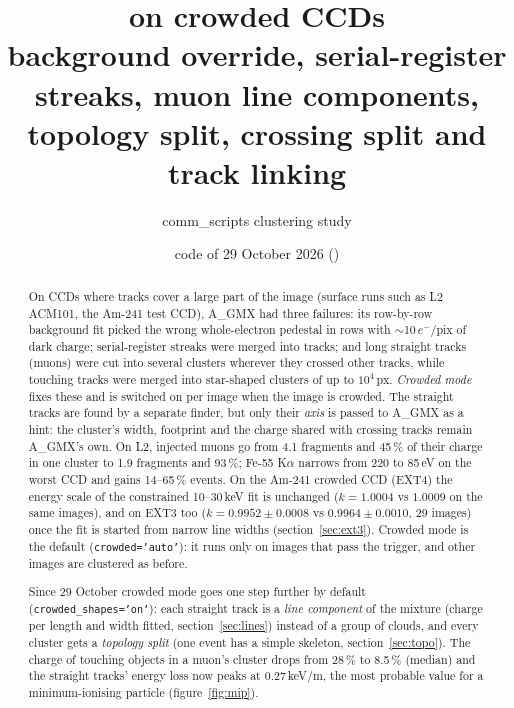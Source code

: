 \documentclass[11pt,a4paper]{article}
\title{\textbf{\AGMX{} on crowded CCDs}\\[4pt]
\large background override, serial-register streaks, muon line components, topology split, crossing split and track linking}
\author{comm\_scripts clustering study}
\date{code of 29 October 2026 (\code{clustering\_tests/crowded.py})}
\newcommand{\el}{\ensuremath{e^-}}
\newcommand{\AGMX}{A\_GMX}
\newcommand{\code}[1]{\texttt{#1}}
\begin{document}
\maketitle

\begin{abstract}
On CCDs where tracks cover a large part of the image (surface runs such as L2 ACM101, the Am-241 test CCD), \AGMX{} had
three failures: its row-by-row background fit picked the wrong whole-electron pedestal in rows with
$\sim$10\,\el/pix of dark charge; serial-register streaks were merged into tracks; and long straight tracks
(muons) were cut into several clusters wherever they crossed other tracks, while touching tracks were merged into star-shaped
clusters of up to $10^4$\,px. \emph{Crowded mode} fixes these and is switched on per image when the image is crowded. The
straight tracks are found by a separate finder, but only their \emph{axis} is passed to \AGMX{} as a hint: the cluster's
width, footprint and the charge shared with crossing tracks remain \AGMX's own. On L2, injected muons go from 4.1 fragments
and 45\,\% of their charge in one cluster to 1.9 fragments and 93\,\%; Fe-55 K$\alpha$ narrows from 220 to 85\,eV on the
worst CCD and gains 14--65\,\% events. On the Am-241 crowded CCD (EXT4) the energy scale of the constrained 10--30\,keV fit is
unchanged ($k=1.0004$ vs $1.0009$ on the same images), and on EXT3 too ($k=0.9952\pm0.0008$ vs $0.9964\pm0.0010$, 29 images)
once the fit is started from narrow line widths (section~\ref{sec:ext3}). Crowded mode is the default
(\code{crowded='auto'}): it runs only on images that pass the trigger, and other images are clustered as before.

Since 29 October crowded mode goes one step further by default (\code{crowded\_shapes='on'}): each straight track is a
\emph{line component} of the mixture (charge per length and width fitted, section~\ref{sec:lines}) instead of a group of clouds,
and every cluster gets a \emph{topology split} (one event has a simple skeleton, section~\ref{sec:topo}). The charge of
touching objects in a muon's cluster drops from 28\,\% to 8.5\,\% (median) and the straight tracks' energy loss now peaks at
0.27\,keV/\textmu m, the most probable value for a minimum-ionising particle (figure~\ref{fig:mip}).
\end{abstract}

\tableofcontents

\end{document}
